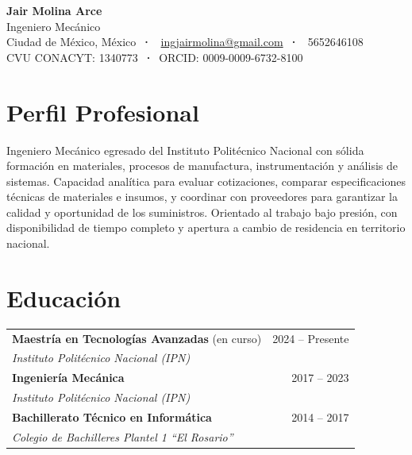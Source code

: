 \documentclass[10pt, letterpaper]{article}
\begin{document}
\pagestyle{empty}

\begin{center}
  {\LARGE\bfseries\color{azul} Jair Molina Arce}\\[4pt]
  {\large\color{gris} Ingeniero Mecánico}\\[6pt]
  \small
  \textcolor{gris}{Ciudad de México, México}~\textbf{·}~
  \href{mailto:ingjairmolina@gmail.com}{ingjairmolina@gmail.com}~\textbf{·}~
  5652646108\\[2pt]
  CVU CONACYT: 1340773~\textbf{·}~ORCID: 0009-0009-6732-8100
\end{center}

\vspace{6pt}

\section{Perfil Profesional}

Ingeniero Mecánico egresado del Instituto Politécnico Nacional con sólida formación en
materiales, procesos de manufactura, instrumentación y análisis de sistemas.
Capacidad analítica para evaluar cotizaciones, comparar especificaciones técnicas de
materiales e insumos, y coordinar con proveedores para garantizar la calidad y oportunidad
de los suministros. Orientado al trabajo bajo presión, con disponibilidad de tiempo
completo y apertura a cambio de residencia en territorio nacional.

\section{Educación}

\noindent
\begin{tabularx}{\linewidth}{@{}X r@{}}
  \textbf{Maestría en Tecnologías Avanzadas} \textcolor{gris}{(en curso)} &
    \textcolor{gris}{2024 – Presente} \\
  \textit{Instituto Politécnico Nacional (IPN)} & \\[4pt]

  \textbf{Ingeniería Mecánica} &
    \textcolor{gris}{2017 – 2023} \\
  \textit{Instituto Politécnico Nacional (IPN)} & \\[4pt]

  \textbf{Bachillerato Técnico en Informática} &
    \textcolor{gris}{2014 – 2017} \\
  \textit{Colegio de Bachilleres Plantel 1 ``El Rosario''} & \\
\end{tabularx}
\end{document}
